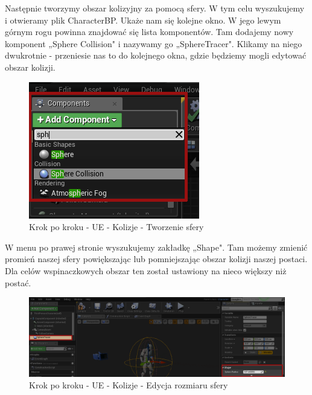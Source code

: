 \documentclass[openright]{xmgr}
\begin{document}
\newpage
Następnie tworzymy obszar kolizyjny za pomocą sfery. W tym celu wyszukujemy i otwieramy plik CharacterBP. Ukaże nam się kolejne okno. W jego lewym górnym rogu powinna znajdować się lista komponentów. Tam dodajemy nowy komponent „Sphere Collision" i nazywamy go „SphereTracer". Klikamy na niego dwukrotnie - przeniesie nas to do kolejnego okna, gdzie będziemy mogli edytować obszar kolizji.

\begin{figure}[!htb]
    \begin{center}
    \includegraphics[scale=0.5]{Screeny/UeKrokPoKroku/UE-Climb-Sphere01.png}
    \end{center}
    \caption{Krok po kroku - UE - Kolizje - Tworzenie sfery}
\end{figure}
\newpage

W menu po prawej stronie wyszukujemy zakładkę „Shape". Tam możemy zmienić promień naszej sfery powiększając lub pomniejszając obszar kolizji naszej postaci. Dla celów wspinaczkowych obszar ten został ustawiony na nieco większy niż postać.

\begin{figure}[!htb]
    \begin{center}
    \includegraphics[scale=0.35]{Screeny/UeKrokPoKroku/UE-Climb-Sphere02.png}
    \end{center}
    \caption{Krok po kroku - UE - Kolizje - Edycja rozmiaru sfery}
\end{figure}
\end{document}
